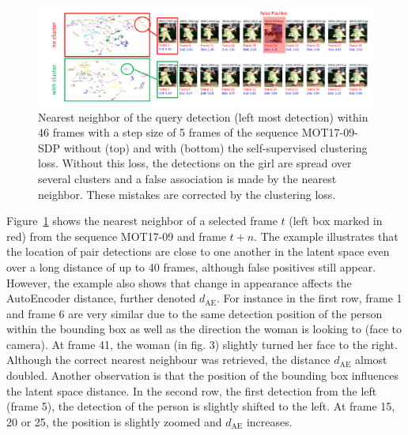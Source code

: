 \begin{figure}[t]
	\begin{center}
		\includegraphics[width=1.0\linewidth]{Fig_4_figure.pdf}
	\end{center}
	\caption{Nearest neighbor of the query detection (left most detection) within 46 frames with a step size of 5 frames of the sequence MOT17-09-SDP without (top) and with (bottom) the self-supervised clustering loss. Without this loss, the detections on the girl are spread over several clusters and a false association is made by the nearest neighbor. These mistakes are corrected by the clustering loss. }  
	\label{fig:figure3}
\end{figure}

Figure~\ref{fig:figure3} shows the nearest neighbor of a selected frame $t$ (left box marked in red) from the sequence MOT17-09 and frame $t+n$. 
The example illustrates that the location of pair detections are close to one another in the latent space even over a long distance of up to 40 frames, although false positives still appear. 
However, the example also shows that change in appearance affects the AutoEncoder distance, further denoted $d_{\mathrm{AE}}$. 
For instance in the first row, frame 1 and frame 6 are very similar due to the same detection position of the person within the bounding box as well as the direction the woman is looking to (face to camera). 
At frame 41, the woman (in fig. 3) slightly turned her face to the right. 
Although the correct nearest neighbour was retrieved, the distance $d_{\mathrm{AE}}$ almost doubled.
Another observation is that the position of the bounding box influences the latent space distance.
In the second row, the first detection from the left (frame 5), the detection of the person is slightly shifted to the left. 
At frame 15, 20 or 25, the position is slightly zoomed and $d_{\mathrm{AE}}$ increases.

